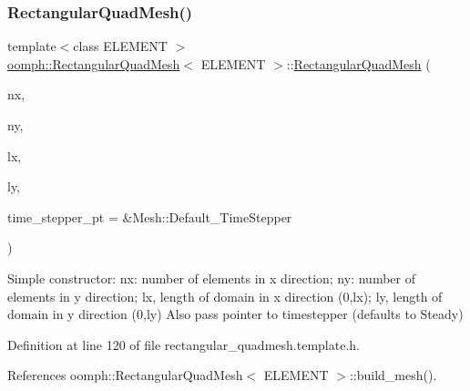 \subsubsection{\texorpdfstring{Rectangular\+Quad\+Mesh()}{RectangularQuadMesh()}\hspace{0.1cm}{\footnotesize\ttfamily [2/5]}}
{\footnotesize\ttfamily template$<$class E\+L\+E\+M\+E\+NT $>$ \\
\hyperlink{classoomph_1_1RectangularQuadMesh}{oomph\+::\+Rectangular\+Quad\+Mesh}$<$ E\+L\+E\+M\+E\+NT $>$\+::\hyperlink{classoomph_1_1RectangularQuadMesh}{Rectangular\+Quad\+Mesh} (\begin{DoxyParamCaption}\item[{const unsigned \&}]{nx,  }\item[{const unsigned \&}]{ny,  }\item[{const double \&}]{lx,  }\item[{const double \&}]{ly,  }\item[{Time\+Stepper $\ast$}]{time\+\_\+stepper\+\_\+pt = {\ttfamily \&Mesh\+:\+:Default\+\_\+TimeStepper} }\end{DoxyParamCaption})\hspace{0.3cm}{\ttfamily [inline]}}



Simple constructor\+: nx\+: number of elements in x direction; ny\+: number of elements in y direction; lx, length of domain in x direction (0,lx); ly, length of domain in y direction (0,ly) Also pass pointer to timestepper (defaults to Steady) 



Definition at line 120 of file rectangular\+\_\+quadmesh.\+template.\+h.



References oomph\+::\+Rectangular\+Quad\+Mesh$<$ E\+L\+E\+M\+E\+N\+T $>$\+::build\+\_\+mesh().

\mbox{\label{classoomph_1_1RectangularQuadMesh_aea506679674e4fc5c43b62a53798d0be}} 
